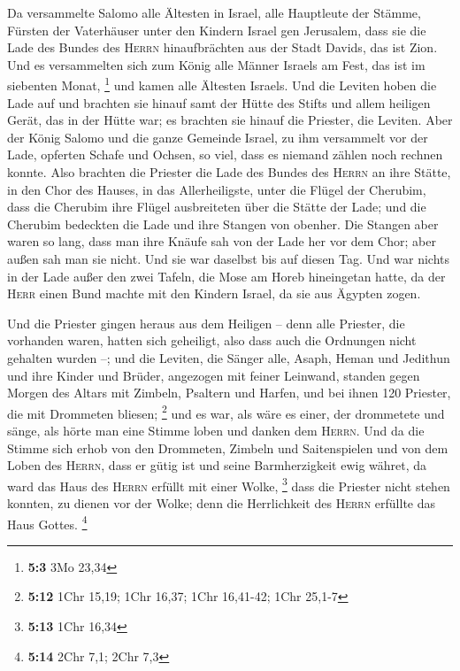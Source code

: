  Da versammelte Salomo alle Ältesten in Israel, alle
Hauptleute der Stämme, Fürsten der Vaterhäuser unter den Kindern Israel
gen Jerusalem, dass sie die Lade des Bundes des \textsc{Herrn}
hinaufbrächten aus der Stadt Davids, das ist Zion.  Und es
versammelten sich zum König alle Männer Israels am Fest, das ist im
siebenten Monat, \footnote{\textbf{5:3} 3Mo 23,34}  und
kamen alle Ältesten Israels. Und die Leviten hoben die Lade auf
 und brachten sie hinauf samt der Hütte des Stifts und
allem heiligen Gerät, das in der Hütte war; es brachten sie hinauf die
Priester, die Leviten.  Aber der König Salomo und die
ganze Gemeinde Israel, zu ihm versammelt vor der Lade, opferten Schafe
und Ochsen, so viel, dass es niemand zählen noch rechnen konnte.
 Also brachten die Priester die Lade des Bundes des
\textsc{Herrn} an ihre Stätte, in den Chor des Hauses, in das
Allerheiligste, unter die Flügel der Cherubim,  dass die
Cherubim ihre Flügel ausbreiteten über die Stätte der Lade; und die
Cherubim bedeckten die Lade und ihre Stangen von obenher. 
Die Stangen aber waren so lang, dass man ihre Knäufe sah von der Lade
her vor dem Chor; aber außen sah man sie nicht. Und sie war daselbst bis
auf diesen Tag.  Und war nichts in der Lade außer den
zwei Tafeln, die Mose am Horeb hineingetan hatte, da der \textsc{Herr}
einen Bund machte mit den Kindern Israel, da sie aus Ägypten zogen.

 Und die Priester gingen heraus aus dem Heiligen -- denn
alle Priester, die vorhanden waren, hatten sich geheiligt, also dass
auch die Ordnungen nicht gehalten wurden --;  und die
Leviten, die Sänger alle, Asaph, Heman und Jedithun und ihre Kinder und
Brüder, angezogen mit feiner Leinwand, standen gegen Morgen des Altars
mit Zimbeln, Psaltern und Harfen, und bei ihnen 120 Priester, die mit
Drommeten bliesen; \footnote{\textbf{5:12} 1Chr 15,19; 1Chr 16,37; 1Chr
  16,41-42; 1Chr 25,1-7}  und es war, als wäre es einer,
der drommetete und sänge, als hörte man eine Stimme loben und danken dem
\textsc{Herrn}. Und da die Stimme sich erhob von den Drommeten, Zimbeln
und Saitenspielen und von dem Loben des \textsc{Herrn}, dass er gütig
ist und seine Barmherzigkeit ewig währet, da ward das Haus des
\textsc{Herrn} erfüllt mit einer Wolke, \footnote{\textbf{5:13} 1Chr
  16,34}  dass die Priester nicht stehen konnten, zu
dienen vor der Wolke; denn die Herrlichkeit des \textsc{Herrn} erfüllte
das Haus Gottes. \footnote{\textbf{5:14} 2Chr 7,1; 2Chr 7,3}

